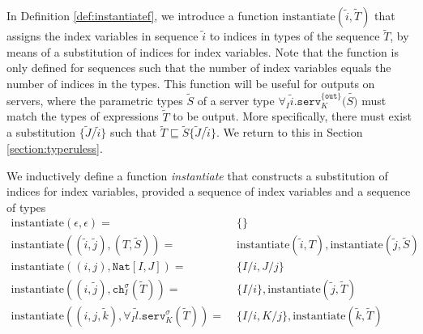 In Definition \ref{def:instantiatef}, we introduce a function $\text{instantiate}(\widetilde{i},\widetilde{T})$ that assigns the index variables in sequence $\widetilde{i}$ to indices in types of the sequence $\widetilde{T}$, by means of a substitution of indices for index variables. Note that the function is only defined for sequences such that the number of index variables equals the number of indices in the types. This function will be useful for outputs on servers, where the parametric types $\widetilde{S}$ of a server type $\forall_I\widetilde{i}.\texttt{serv}^{\{\texttt{out}\}}_K(\widetilde{S)}$ must match the types of expressions $\widetilde{T}$ to be output. More specifically, there must exist a substitution $\{\widetilde{J}/\widetilde{i}\}$ such that $\widetilde{T} \sqsubseteq \widetilde{S}\{\widetilde{J}/\widetilde{i}\}$. We return to this in Section \ref{section:typeruless}.

\begin{defi}\label{def:instantiatef}
We inductively define a function \textit{instantiate} that constructs a substitution of indices for index variables, provided a sequence of index variables and a sequence of types%
\begin{align*}
    \text{instantiate}(\epsilon,\epsilon) =&\; \{\}\\
    \text{instantiate}((\widetilde{i},\widetilde{j}),(T,\widetilde{S})) =&\; \text{instantiate}(\widetilde{i},T),\text{instantiate}(\widetilde{j},\widetilde{S})\\
    \text{instantiate}((i,j),\texttt{Nat}[I,J]) =&\; \{I/i,J/j\}\\
    \text{instantiate}((i,\widetilde{j}),\texttt{ch}_I^\sigma(\widetilde{T})) =&\; \{I/i\},\text{instantiate}(\widetilde{j},\widetilde{T})\\
    \text{instantiate}((i,j,\widetilde{k}),\forall_I\widetilde{l}.\texttt{serv}^\sigma_K(\widetilde{T})) =&\; \{I/i,K/j\},\text{instantiate}(\widetilde{k},\widetilde{T})
\end{align*}
\end{defi}